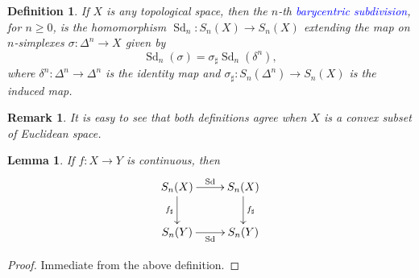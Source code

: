 \documentclass[10pt]{article}
\theoremstyle{thmstyle}
\newtheorem{lemma}[theorem]{Lemma}
\theoremstyle{defstyle}
\newtheorem{definition}[theorem]{Definition}
\newtheorem{remark}[theorem]{Remark}
\newcommand{\define}[1]{\textcolor{blue}{\textit{#1}}}
\renewcommand{\ge}{\geqslant}
\newcommand{\Sd}{\operatorname{Sd}}
\begin{document}
\begin{definition}
    If $X$ is any topological space, then the $n$-th \define{barycentric subdivision}, for $n\ge 0$, is the homomorphism $\Sd_n: S_n(X)\to S_n(X)$ extending the map on $n$-simplexes $\sigma: \Delta^n\to X$ given by 
    \begin{equation*}
        \Sd_n(\sigma) = \sigma_\sharp\Sd_n(\delta^n),
    \end{equation*}
    where $\delta^n: \Delta^n\to\Delta^n$ is the identity map and $\sigma_\sharp: S_n(\Delta^n)\to S_n(X)$ is the induced map.
\end{definition}

\begin{remark}
    It is easy to see that both definitions agree when $X$ is a convex subset of Euclidean space. 
\end{remark}

\begin{lemma}
    If $f: X\to Y$ is continuous, then 
    \begin{equation*}
        \xymatrix {
            S_n(X)\ar[r]^{\Sd}\ar[d]_{f_\sharp} & S_n(X)\ar[d]^{f_\sharp}\\
            S_n(Y)\ar[r]_{\Sd} & S_n(Y)
        }
    \end{equation*}
\end{lemma}
\begin{proof}
    Immediate from the above definition.
\end{proof}
\end{document}

